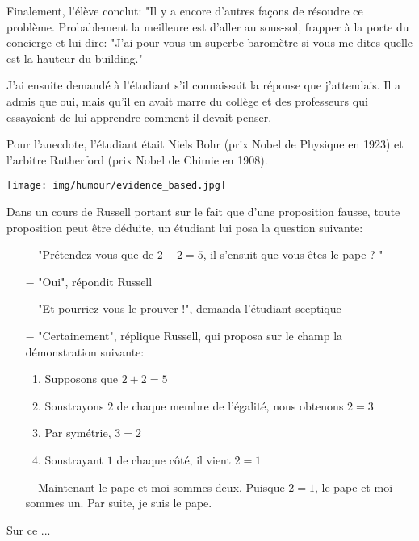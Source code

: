 Finalement, l'élève conclut: "Il y a encore d'autres façons de résoudre ce problème. Probablement la meilleure est d'aller au sous-sol, frapper à la porte du concierge et lui dire: "J'ai pour vous un superbe baromètre si vous me dites quelle est la hauteur du building."

J'ai ensuite demandé à l'étudiant s'il connaissait la réponse que j'attendais. Il a admis que oui, mais qu'il en avait marre du collège et des professeurs qui essayaient de lui apprendre comment il devait penser.

Pour l'anecdote, l'étudiant était Niels Bohr (prix Nobel de Physique en 1923) et l'arbitre Rutherford (prix Nobel de Chimie en 1908).

\begin{center}\underline{\hspace{5 cm}}\end{center}

\begin{center}
	\texttt{[image: img/humour/evidence\_based.jpg]}	
\end{center}
\pagebreak
Dans un cours de Russell portant sur le fait que d'une proposition fausse, toute proposition peut être déduite, un étudiant lui posa la question suivante:

\begin{itemize}	 
	\item[$-$] "Prétendez-vous que de $2 + 2 = 5$, il s'ensuit que vous êtes le pape ? "

	\item[$-$] "Oui", répondit Russell

	\item[$-$] "Et pourriez-vous le prouver !", demanda l'étudiant sceptique

	\item[$-$] "Certainement", réplique Russell, qui proposa sur le champ la démonstration suivante:

	\begin{enumerate}
		\item Supposons que $2 + 2 = 5$

		\item Soustrayons $2$ de chaque membre de l'égalité, nous obtenons $2 = 3$

		\item Par symétrie, $3 = 2$

		\item Soustrayant $1$ de chaque côté, il vient $2 =1$
	\end{enumerate}

	\item[$-$] Maintenant le pape et moi sommes deux. Puisque $2 = 1$, le pape et moi sommes un. Par suite, je suis le pape.
\end{itemize}
Sur ce ...

